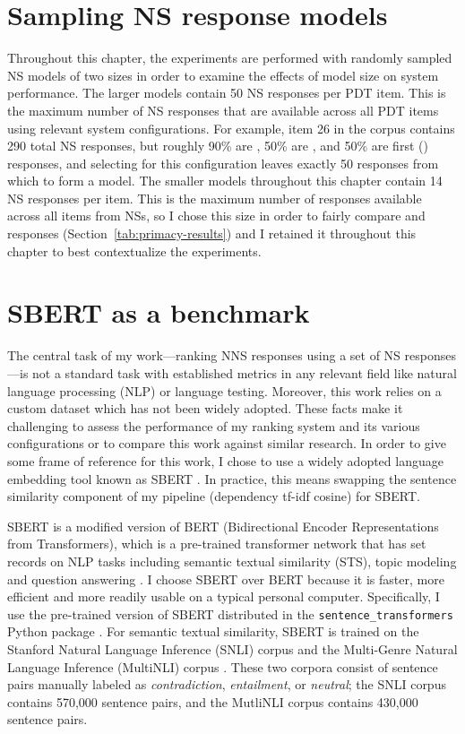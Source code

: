 \section{Sampling NS response models}
\label{sec:sampling}

Throughout this chapter, the experiments are performed with randomly sampled NS models of two sizes in order to examine the effects of model size on system performance. The larger models contain 50 NS responses per PDT item. This is the maximum number of NS responses that are available across all PDT items using relevant system configurations. For example, item 26 in the corpus contains 290 total NS responses, but roughly 90\% are , 50\% are , and 50\% are first () responses, and selecting for this configuration leaves exactly 50 responses from which to form a model. The smaller models throughout this chapter contain 14 NS responses per item. This is the maximum number of responses available across all items from  NSs, so I chose this size in order to fairly compare  and  responses (Section~\ref{tab:primacy-results}) and I retained it throughout this chapter to best contextualize the  experiments.

\section{SBERT as a benchmark}
\label{sec:bert-benchmark}
The central task of my work---ranking NNS responses using a set of NS responses---is not a standard task with established metrics in any relevant field like natural language processing (NLP) or language testing. Moreover, this work relies on a custom dataset which has not been widely adopted. These facts make it challenging to assess the performance of my ranking system and its various configurations or to compare this work against similar research. In order to give some frame of reference for this work, I chose to use a widely adopted language embedding tool known as SBERT \cite{sbert2020}. In practice, this means swapping the sentence similarity component of my pipeline (dependency tf-idf cosine) for SBERT.

SBERT is a modified version of BERT (Bidirectional Encoder Representations from Transformers), which is a pre-trained transformer network that has set records on NLP tasks including semantic textual similarity (STS), topic modeling and question answering \cite{BertDevlin2018}. I choose SBERT over BERT because it is faster, more efficient and more readily usable on a typical personal computer. Specifically, I use the pre-trained version of SBERT distributed in the \texttt{sentence\_transformers} Python package \cite{sbert-python}. For semantic textual similarity, SBERT is trained on the Stanford Natural Language Inference (SNLI) corpus \cite{bowman2015} and the Multi-Genre Natural Language Inference (MultiNLI) corpus \cite{MultiNLI2018}. These two corpora consist of sentence pairs manually labeled as \textit{contradiction}, \textit{entailment}, or \textit{neutral}; the SNLI corpus contains 570,000 sentence pairs, and the MutliNLI corpus contains 430,000 sentence pairs.
 
